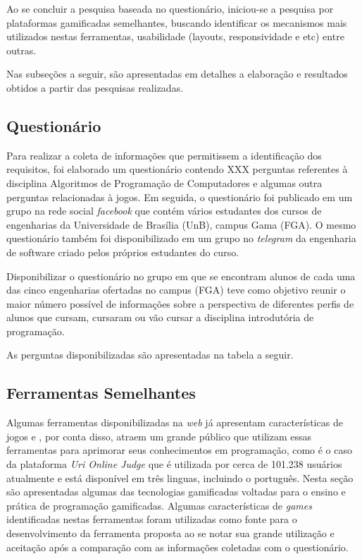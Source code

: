 Ao se concluir a pesquisa baseada no questionário, iniciou-se a pesquisa por plataformas gamificadas semelhantes, buscando
identificar os mecanismos mais utilizados nestas ferramentas, usabilidade (layouts, responsividade e etc) entre outras.

Nas subseções a seguir, são apresentadas em detalhes a elaboração e resultados obtidos a partir das pesquisas realizadas.

\subsection{Questionário}
Para realizar a coleta de informações que permitissem a identificação dos requisitos, foi elaborado um questionário 
contendo XXX perguntas referentes à disciplina Algoritmos de Programação de Computadores e algumas outra perguntas
relacionadas à jogos. Em seguida, o questionário foi publicado em um grupo na rede social \textit{facebook} que contém
vários estudantes dos cursos de engenharias da Universidade de Brasília (UnB), campus Gama (FGA). O mesmo questionário
também foi disponibilizado em um grupo no \textit{telegram} da engenharia de software criado pelos próprios estudantes do
curso. 

Disponibilizar o questionário no grupo em que se encontram alunos de cada uma das cinco engenharias ofertadas no campus (FGA)
teve como objetivo reunir o maior número possível de informações sobre a perspectiva de diferentes perfis de alunos que cursam, cursaram ou vão
cursar a disciplina introdutória de programação.


As perguntas disponibilizadas são apresentadas na tabela a seguir.

\subsection{Ferramentas Semelhantes}
Algumas ferramentas disponibilizadas na \textit{web} já apresentam características de jogos e , por conta disso,
atraem um grande público que utilizam essas ferramentas para aprimorar seus conhecimentos em programação, como é
o caso da plataforma \textit{Uri Online Judge} que é utilizada por cerca de 101.238 usuários atualmente e está disponível em três
linguas, incluindo o português.
Nesta seção são apresentadas algumas das tecnologias gamificadas voltadas para o ensino e prática de programação
gamificadas. Algumas características de \textit{games} identificadas nestas ferramentas foram utilizadas como fonte
para o desenvolvimento da ferramenta proposta ao se notar sua grande utilização e aceitação após a comparação com as 
informações coletadas com o questionário.

